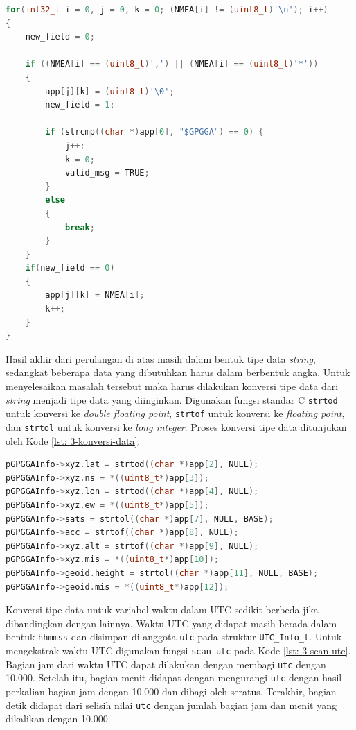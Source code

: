\vspace{0.3cm}
\begin{lstlisting}[language=c, style=mystyle, caption={\textit{Parsing} Kalimat \$GPGGA pada \textit{Firmware}}, label={lst: 3-parse-gpgga}]
for(int32_t i = 0, j = 0, k = 0; (NMEA[i] != (uint8_t)'\n'); i++)
{
	new_field = 0;
	
	if ((NMEA[i] == (uint8_t)',') || (NMEA[i] == (uint8_t)'*'))
	{
		app[j][k] = (uint8_t)'\0';
		new_field = 1;
		
		if (strcmp((char *)app[0], "$GPGGA") == 0) {
			j++;
			k = 0;
			valid_msg = TRUE;
		}
		else
		{
			break;
		}
	}
	if(new_field == 0)
	{
		app[j][k] = NMEA[i];
		k++;
	}
}
\end{lstlisting}

Hasil akhir dari perulangan di atas masih dalam bentuk tipe data \textit{string}, sedangkat beberapa data yang dibutuhkan harus dalam berbentuk angka. Untuk menyelesaikan masalah tersebut maka harus dilakukan konversi tipe data dari \textit{string} menjadi tipe data yang diinginkan. Digunakan fungsi standar C \texttt{strtod} untuk konversi ke \textit{double floating point}, \texttt{strtof} untuk konversi ke \textit{floating point}, dan \texttt{strtol} untuk konversi ke \textit{long integer}. Proses konversi tipe data ditunjukan oleh Kode \ref{lst: 3-konversi-data}.

\vspace{0.3cm}
\begin{lstlisting}[language=c, style=mystyle, caption={ \textit{Casting} Tipe Data String ke Tipe Data Lainnya}, label={lst: 3-konversi-data}]
pGPGGAInfo->xyz.lat = strtod((char *)app[2], NULL);
pGPGGAInfo->xyz.ns = *((uint8_t*)app[3]);
pGPGGAInfo->xyz.lon = strtod((char *)app[4], NULL);
pGPGGAInfo->xyz.ew = *((uint8_t*)app[5]);
pGPGGAInfo->sats = strtol((char *)app[7], NULL, BASE);
pGPGGAInfo->acc = strtof((char *)app[8], NULL);
pGPGGAInfo->xyz.alt = strtof((char *)app[9], NULL);
pGPGGAInfo->xyz.mis = *((uint8_t*)app[10]);
pGPGGAInfo->geoid.height = strtol((char *)app[11], NULL, BASE);
pGPGGAInfo->geoid.mis = *((uint8_t*)app[12]);
\end{lstlisting}

Konversi tipe data untuk variabel waktu dalam UTC sedikit berbeda jika dibandingkan dengan lainnya. Waktu UTC yang didapat masih berada dalam bentuk \texttt{hhmmss} dan disimpan di anggota \texttt{utc} pada struktur \texttt{UTC\_Info\_t}. Untuk mengekstrak waktu UTC digunakan fungsi \texttt{scan\_utc} pada Kode \ref{lst: 3-scan-utc}. Bagian jam dari waktu UTC dapat dilakukan dengan membagi \texttt{utc} dengan 10.000. Setelah itu, bagian menit didapat dengan mengurangi \texttt{utc} dengan hasil perkalian bagian jam dengan 10.000 dan dibagi oleh seratus. Terakhir, bagian detik didapat dari selisih nilai \texttt{utc} dengan jumlah bagian jam dan menit yang dikalikan dengan 10.000.


